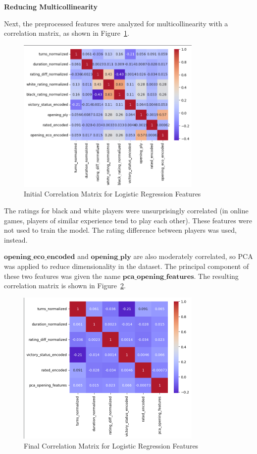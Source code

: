 \documentclass[12pt]{article}
\begin{document}
\noindent\textbf{Reducing Multicollinearity}

Next, the preprocessed features were analyzed for multicollinearity with a correlation matrix, as shown in Figure~\ref{fig:corr-matrix-1}.

\begin{figure}[H]
\centering
\includegraphics[width=0.8\textwidth]{corr-matrix-1.png}
\caption{Initial Correlation Matrix for Logistic Regression Features}
\label{fig:corr-matrix-1}
\end{figure}

The ratings for black and white players were unsurprisingly correlated (in online games, players of similar experience tend to play each other). These features were not used to train the model. The rating difference between players was used, instead.

$\textbf{opening\_eco\_encoded}$ and $\textbf{opening\_ply}$ are also moderately correlated, so PCA was applied to reduce dimensionality in the dataset. The principal component of these two features was given the name $\textbf{pca\_opening\_features}$. The resulting correlation matrix is shown in Figure~\ref{fig:corr-matrix-2}.

\begin{figure}[H]
\centering
\includegraphics[width=0.8\textwidth]{corr-matrix-2.png}
\caption{Final Correlation Matrix for Logistic Regression Features}
\label{fig:corr-matrix-2}
\end{figure}
\end{document}
